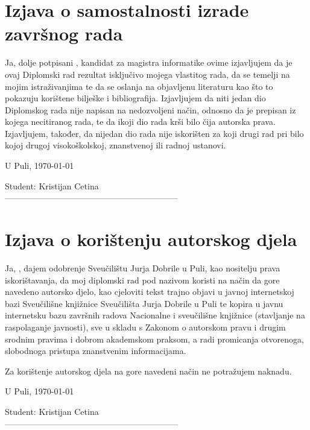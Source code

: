 \chapter*{Izjava o samostalnosti izrade završnog rada}

Ja, dolje potpisani \authorName, kandidat za magistra informatike ovime izjavljujem da je ovaj Diplomski rad rezultat isključivo mojega vlastitog rada, da se temelji na mojim istraživanjima te da se oslanja na objavljenu literaturu kao što to pokazuju korištene bilješke i bibliografija.
Izjavljujem da niti jedan dio Diplomskog rada nije napisan na nedozvoljeni način, odnosno da je prepisan iz kojega necitiranog rada, te da ikoji dio rada krši bilo čija autorska prava.
Izjavljujem, također, da nijedan dio rada nije iskorišten za koji drugi rad pri bilo kojoj drugoj 
visokoškolskoj, znanstvenoj ili radnoj ustanovi.

\vspace{2 cm}
U Puli, \today

\vspace{\fill}
\begin{flushright}
Student: Kristijan Cetina\\
\vspace{15mm}
--------------------------------------------------------------
\end{flushright}

\pagebreak

\chapter*{Izjava o korištenju autorskog djela}

Ja, \authorName{}, dajem odobrenje Sveučilištu Jurja Dobrile u Puli, kao nositelju prava iskorištavanja, da moj diplomski rad pod nazivom \naslovRada{} koristi na način da gore navedeno autorsko djelo, kao cjeloviti tekst trajno objavi u javnoj internetskoj bazi Sveučilišne knjižnice Sveučilišta Jurja Dobrile u Puli te kopira u javnu internetsku bazu završnih radova Nacionalne i sveučilišne knjižnice (stavljanje na raspolaganje javnosti), sve u skladu s Zakonom o autorskom pravu i drugim srodnim pravima i dobrom akademskom praksom, a radi promicanja otvorenoga, slobodnoga pristupa znanstvenim informacijama. 

Za korištenje autorskog djela na gore navedeni način ne potražujem naknadu.

\vspace{2 cm}
U Puli, \today

\vspace{\fill}
\begin{flushright}
Student: Kristijan Cetina\\
\vspace{15mm}
--------------------------------------------------------------
\end{flushright}